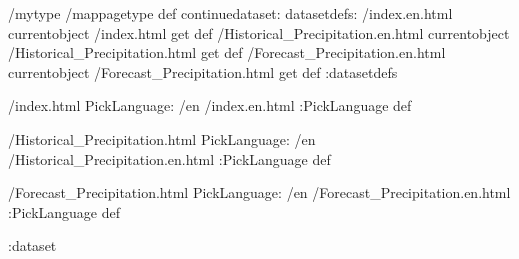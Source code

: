 \begin{ingrid}
/mytype /mappagetype def
continuedataset:
datasetdefs:
/index.en.html currentobject /index.html get def
/Historical_Precipitation.en.html currentobject /Historical_Precipitation.html get def
/Forecast_Precipitation.en.html currentobject /Forecast_Precipitation.html get def
:datasetdefs

/index.html {
PickLanguage:
/en /index.en.html
:PickLanguage
} def

/Historical_Precipitation.html {
PickLanguage:
/en /Historical_Precipitation.en.html
:PickLanguage
} def

/Forecast_Precipitation.html {
PickLanguage:
/en /Forecast_Precipitation.en.html
:PickLanguage
} def

:dataset
\end{ingrid}
